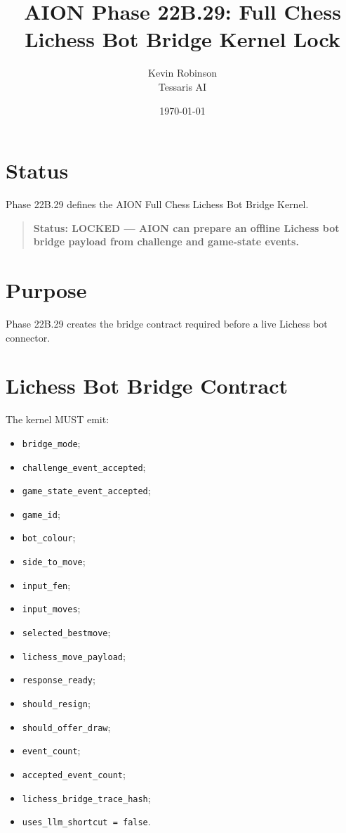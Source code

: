 \documentclass[11pt,a4paper]{article}
\title{\textbf{AION Phase 22B.29: Full Chess Lichess Bot Bridge Kernel Lock}}
\author{Kevin Robinson\\Tessaris AI}
\date{\today}
\begin{document}
\maketitle

\section{Status}

Phase 22B.29 defines the AION Full Chess Lichess Bot Bridge Kernel.

\begin{quote}
\textbf{Status: LOCKED --- AION can prepare an offline Lichess bot bridge payload from challenge and game-state events.}
\end{quote}

\section{Purpose}

Phase 22B.29 creates the bridge contract required before a live Lichess bot connector.

\section{Lichess Bot Bridge Contract}

The kernel MUST emit:

\begin{itemize}
  \item \texttt{bridge\_mode};
  \item \texttt{challenge\_event\_accepted};
  \item \texttt{game\_state\_event\_accepted};
  \item \texttt{game\_id};
  \item \texttt{bot\_colour};
  \item \texttt{side\_to\_move};
  \item \texttt{input\_fen};
  \item \texttt{input\_moves};
  \item \texttt{selected\_bestmove};
  \item \texttt{lichess\_move\_payload};
  \item \texttt{response\_ready};
  \item \texttt{should\_resign};
  \item \texttt{should\_offer\_draw};
  \item \texttt{event\_count};
  \item \texttt{accepted\_event\_count};
  \item \texttt{lichess\_bridge\_trace\_hash};
  \item \texttt{uses\_llm\_shortcut = false}.
\end{itemize}
\end{document}

